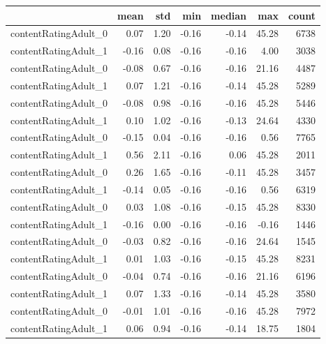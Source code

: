 \begin{tabular}{lrrrrrr}
\toprule
{} &  mean &  std &   min &  median &   max &  count \\
\midrule
contentRatingAdult\_0 & 0.07 & 1.20 & -0.16 & -0.14 & 45.28 &  6738 \\
contentRatingAdult\_1 & -0.16 & 0.08 & -0.16 & -0.16 & 4.00 &  3038 \\
contentRatingAdult\_0 & -0.08 & 0.67 & -0.16 & -0.16 & 21.16 &  4487 \\
contentRatingAdult\_1 & 0.07 & 1.21 & -0.16 & -0.14 & 45.28 &  5289 \\
contentRatingAdult\_0 & -0.08 & 0.98 & -0.16 & -0.16 & 45.28 &  5446 \\
contentRatingAdult\_1 & 0.10 & 1.02 & -0.16 & -0.13 & 24.64 &  4330 \\
contentRatingAdult\_0 & -0.15 & 0.04 & -0.16 & -0.16 & 0.56 &  7765 \\
contentRatingAdult\_1 & 0.56 & 2.11 & -0.16 & 0.06 & 45.28 &  2011 \\
contentRatingAdult\_0 & 0.26 & 1.65 & -0.16 & -0.11 & 45.28 &  3457 \\
contentRatingAdult\_1 & -0.14 & 0.05 & -0.16 & -0.16 & 0.56 &  6319 \\
contentRatingAdult\_0 & 0.03 & 1.08 & -0.16 & -0.15 & 45.28 &  8330 \\
contentRatingAdult\_1 & -0.16 & 0.00 & -0.16 & -0.16 & -0.16 &  1446 \\
contentRatingAdult\_0 & -0.03 & 0.82 & -0.16 & -0.16 & 24.64 &  1545 \\
contentRatingAdult\_1 & 0.01 & 1.03 & -0.16 & -0.15 & 45.28 &  8231 \\
contentRatingAdult\_0 & -0.04 & 0.74 & -0.16 & -0.16 & 21.16 &  6196 \\
contentRatingAdult\_1 & 0.07 & 1.33 & -0.16 & -0.14 & 45.28 &  3580 \\
contentRatingAdult\_0 & -0.01 & 1.01 & -0.16 & -0.16 & 45.28 &  7972 \\
contentRatingAdult\_1 & 0.06 & 0.94 & -0.16 & -0.14 & 18.75 &  1804 \\
\bottomrule
\end{tabular}
